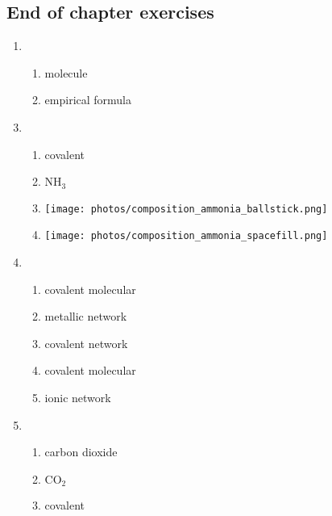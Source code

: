 \subsection{End of chapter exercises} 
\begin{multicols}{3}
\begin{enumerate}[noitemsep, label=\textbf{\arabic*}. ] 
\item %
    \begin{enumerate}[noitemsep, label=\textbf{(\alph*)} ]
  \item molecule
\item empirical formula
 \end{enumerate}
\end{enumerate}
\begin{enumerate}[noitemsep, label=\textbf{(\arabic*)} ]
\setcounter{enumi}{2}
\item %
    \begin{enumerate}[noitemsep, label=\textbf{(\alph*)} ]
 \item covalent
\item $\text{NH}_{3}$
\item \texttt{[image: photos/composition\_ammonia\_ballstick.png]}
\item \texttt{[image: photos/composition\_ammonia\_spacefill.png]}
\end{enumerate}
\item %
    \begin{enumerate}[noitemsep, label=\textbf{(\alph*)} ]
 \item covalent molecular
\item metallic network
\item covalent network
\item covalent molecular
\item ionic network
\end{enumerate}
\item %
    \begin{enumerate}[noitemsep, label=\textbf{(\alph*)} ]
 \item carbon dioxide
\item $\text{CO}_2$
\item covalent
\end{enumerate}
\end{enumerate}
\end{multicols}


